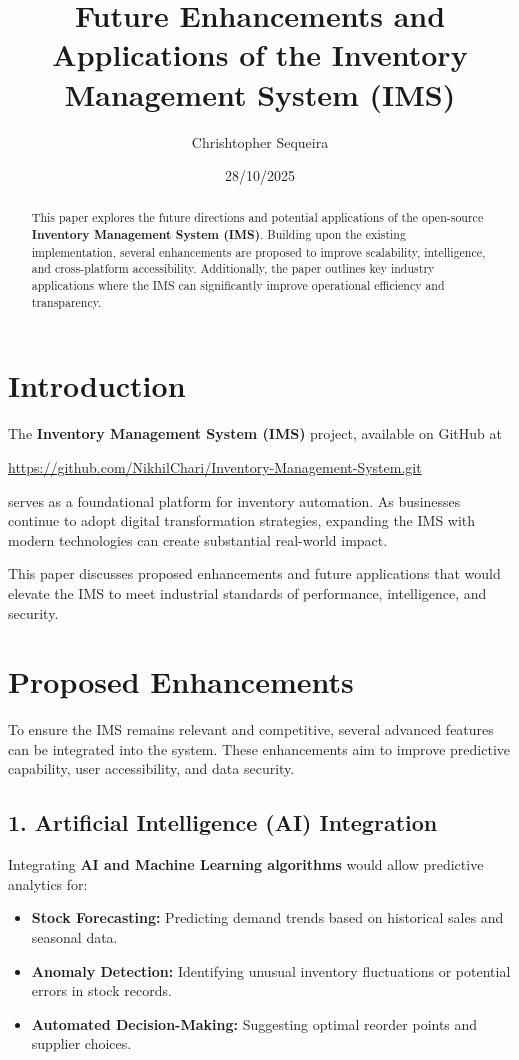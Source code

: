 \documentclass[12pt,a4paper]{article}
\title{\textbf{Future Enhancements and Applications of the Inventory Management System (IMS)}}
\author{Chrishtopher Sequeira}
\date{28/10/2025}
\begin{document}
\maketitle

\begin{abstract}
This paper explores the future directions and potential applications of the open-source \textbf{Inventory Management System (IMS)}. Building upon the existing implementation, several enhancements are proposed to improve scalability, intelligence, and cross-platform accessibility. Additionally, the paper outlines key industry applications where the IMS can significantly improve operational efficiency and transparency.
\end{abstract}

\section{Introduction}
The \textbf{Inventory Management System (IMS)} project, available on GitHub at 

\begin{center}
\href{https://github.com/NikhilChari/Inventory-Management-System.git}{https://github.com/NikhilChari/Inventory-Management-System.git}
\end{center}

serves as a foundational platform for inventory automation. As businesses continue to adopt digital transformation strategies, expanding the IMS with modern technologies can create substantial real-world impact.

This paper discusses proposed enhancements and future applications that would elevate the IMS to meet industrial standards of performance, intelligence, and security.

\section{Proposed Enhancements}
To ensure the IMS remains relevant and competitive, several advanced features can be integrated into the system. These enhancements aim to improve predictive capability, user accessibility, and data security.

\subsection*{1. Artificial Intelligence (AI) Integration}
Integrating \textbf{AI and Machine Learning algorithms} would allow predictive analytics for:
\begin{itemize}
    \item \textbf{Stock Forecasting:} Predicting demand trends based on historical sales and seasonal data.
    \item \textbf{Anomaly Detection:} Identifying unusual inventory fluctuations or potential errors in stock records.
    \item \textbf{Automated Decision-Making:} Suggesting optimal reorder points and supplier choices.
\end{itemize}
\end{document}
